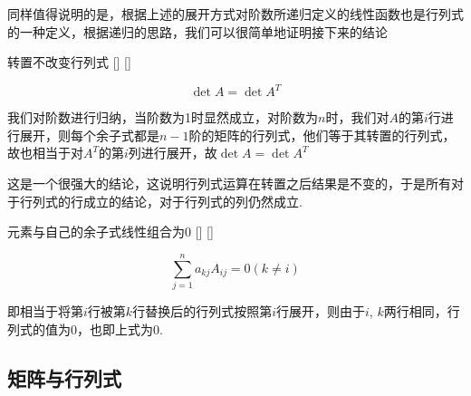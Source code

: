 \documentclass[UTF8]{ctexart}
\begin{document}
        同样值得说明的是，根据上述的展开方式对阶数所递归定义的线性函数也是行列式的一种定义，根据递归的思路，我们可以很简单地证明接下来的结论
    \begin{thm}
			[]
			{转置不改变行列式}
			[]
			[]

        \[\det A=\det A^{T}\]
    \end{thm}
    \begin{prf}
        我们对阶数进行归纳，当阶数为1时显然成立，对阶数为$n$时，我们对$A$的第$i$行进行展开，则每个余子式都是$n-1$阶的矩阵的行列式，他们等于其转置的行列式，故也相当于对$A^{T}$的第$i$列进行展开，故$\det A=\det A^{T}$
    \end{prf}
    这是一个很强大的结论，这说明行列式运算在转置之后结果是不变的，于是所有对于行列式的行成立的结论，对于行列式的列仍然成立.
    \begin{thm}
			[]
			{元素与自己的余子式线性组合为0}
			[]
			[]

        \[\sum_{j=1}^na_{kj}A_{ij}=0(k\neq i)\]
    \end{thm}
    \begin{prf}
        即相当于将第$i$行被第$k$行替换后的行列式按照第$i$行展开，则由于$i$, $k$两行相同，行列式的值为0，也即上式为0.
    \end{prf}

    \subsection{矩阵与行列式}
\end{document}
